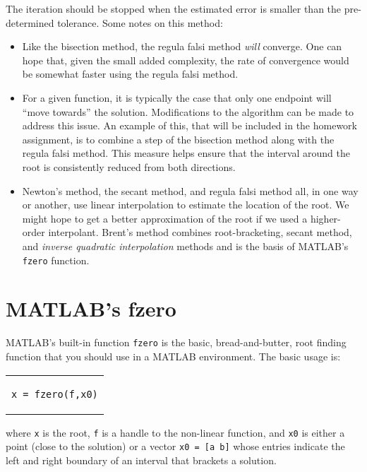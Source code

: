 The iteration should be stopped when the estimated error is smaller than the pre-determined tolerance.  Some notes on this method:
\begin{itemize}
\item Like the bisection method, the regula falsi method \emph{will} converge.  One can hope that, given the small added complexity, the rate of convergence would be somewhat faster using the regula falsi method.
\item For a given function, it is typically the case that only one endpoint will ``move towards'' the solution.  Modifications to the algorithm can be made to address this issue.  An example of this, that will be included in the homework assignment, is to combine a step of the bisection method along with the regula falsi method.  This measure helps ensure that the interval around the root is consistently reduced from both directions. 
\item Newton's method, the secant method, and regula falsi method all, in one way or another, use linear interpolation to estimate the location of the root.  We might hope to get a better approximation of the root if we used a higher-order interpolant. Brent's method combines root-bracketing, secant method, and \emph{inverse quadratic interpolation} methods and is the basis of MATLAB's \lstinline[style=myMatlab]{fzero} function.\cite{forsythe1977computer}
\end{itemize}


\section{MATLAB's fzero}
MATLAB's built-in function \lstinline[style=myMatlab]{fzero} is the basic, bread-and-butter, root finding function that you should use in a MATLAB environment.  The basic usage is:
\begin{center}
\begin{tabular}{c}
\begin{lstlisting}[style=myMatlab, frame=none, numbers=none, basicstyle=\large]
x = fzero(f,x0)
\end{lstlisting}
\end{tabular}
\end{center}
where \lstinline[style=myMatlab]{x} is the root, \lstinline[style=myMatlab]{f} is a handle to the non-linear function, and \lstinline[style=myMatlab]{x0} is either a point (close to the solution) or a vector \lstinline[style=myMatlab]{x0 = [a b]} whose entries indicate the left and right boundary of an interval that brackets a solution.

